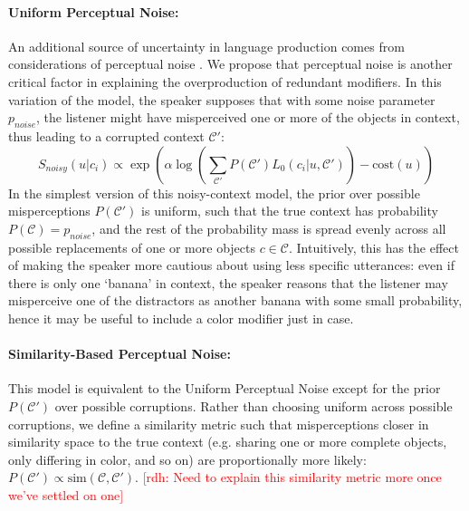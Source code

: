 \documentclass[10pt,letterpaper]{article}
\newcommand{\rdh}[1]{\textcolor{Red}{[rdh: #1]}}
\begin{document}
\paragraph{Uniform Perceptual Noise:} An additional source of uncertainty in language production comes from considerations of perceptual noise \cite<in the speaker or in the listener,>{jaeger2010}. We propose that perceptual noise is another critical factor in explaining the overproduction of redundant modifiers. In this variation of the model, the speaker supposes that with some noise parameter $p_{noise}$, the listener might have misperceived one or more of the objects in context, thus leading to a corrupted context $\mathcal{C}'$:
$$S_{noisy}(u|c_i) \propto \exp\left( \alpha\log\left(\sum_{\mathcal{C'}} P(\mathcal{C}')L_0(c_i | u, \mathcal{C}')\right) - \textrm{cost}(u)\right)$$
In the simplest version of this noisy-context model, the prior over possible misperceptions $P(\mathcal{C}')$ is uniform, such that the true context has probability $P(\mathcal{C}) = p_{noise}$, and the rest of the probability mass is spread evenly across all possible replacements of one or more objects $c \in \mathcal{C}$. Intuitively, this has the effect of making the speaker more cautious about using less specific utterances: even if there is only one `banana' in context, the speaker reasons that the listener may misperceive one of the distractors as another banana with some small probability, hence it may be useful to include a color modifier just in case.

\paragraph{Similarity-Based Perceptual Noise:} This model is equivalent to the Uniform Perceptual Noise except for the prior $P(\mathcal{C'})$ over possible corruptions. Rather than choosing uniform across possible corruptions, we define a similarity metric such that misperceptions closer in similarity space to the true context (e.g. sharing one or more complete objects, only differing in color, and so on) are proportionally more likely: $P(\mathcal{C'}) \propto \textrm{sim}(\mathcal{C}, \mathcal{C'})$.
\rdh{Need to explain this similarity metric more once we've settled on one}

\end{document}

